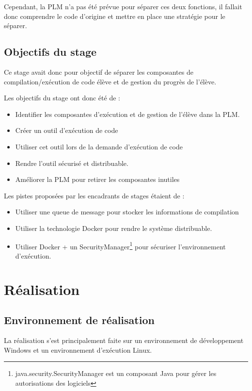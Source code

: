 \documentclass[stage]{tnreport}
\begin{document}
Cependant, la PLM n'a pas été prévue pour séparer ces deux fonctions, il fallait donc comprendre le code d'origine et mettre en place une stratégie pour le séparer.

\section{Objectifs du stage}

Ce stage avait donc pour objectif de séparer les composantes de compilation/exécution de code élève et de gestion du progrès de l'élève.

Les objectifs du stage ont donc été de :
\begin{itemize}
	\item Identifier les composantes d'exécution et de gestion de l'élève dans la PLM.
	\item Créer un outil d'exécution de code
	\item Utiliser cet outil lors de la demande d'exécution de code
	\item Rendre l'outil sécurisé et distribuable.
	\item Améliorer la PLM pour retirer les composantes inutiles
\end{itemize}

Les pistes proposées par les encadrants de stages étaient de :
\begin{itemize}
	\item Utiliser une queue de message pour stocker les informations de compilation
	\item Utiliser la technologie Docker\cite{DCK-WS} pour rendre le système distribuable.
	\item Utiliser Docker + un SecurityManager\footnote{java.security.SecurityManager est un composant Java pour gérer les autorisations des logiciels} pour sécuriser l'environnement d'exécution.
\end{itemize}

\cleardoublepage

\chapter{Réalisation}
\section{Environnement de réalisation}

La réalisation s'est principalement faite sur un environnement de développement Windows et un environnement d'exécution Linux.
\end{document}
